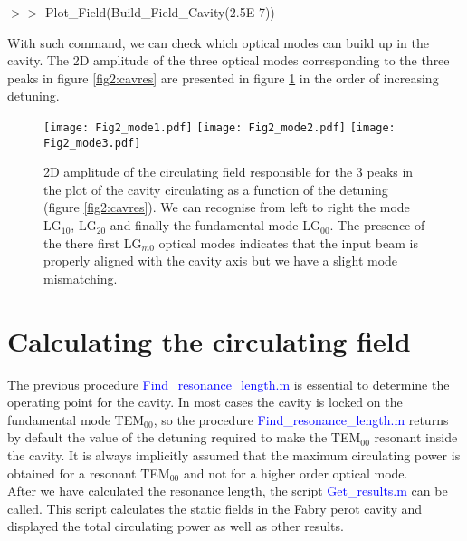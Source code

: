 \vspace*{0.5cm}

$>>$ Plot\_Field(Build\_Field\_Cavity(2.5E-7))

\vspace*{0.5cm}
\noindent With such command, we can check which optical modes can build up in the cavity. The 2D amplitude of the three optical modes corresponding to the three peaks in figure \ref{fig2:cavres} are presented in figure \ref{fig2:HOM} in the order of increasing detuning.


\begin{figure}
\begin{center}
\texttt{[image: Fig2\_mode1.pdf]}\hfill
\texttt{[image: Fig2\_mode2.pdf]}\hfill
\texttt{[image: Fig2\_mode3.pdf]}\hfill
\end{center}
\caption{\label{fig2:HOM} 2D amplitude of the circulating field responsible for the 3 peaks in the plot of the cavity circulating as a function of the detuning (figure \ref{fig2:cavres}). We can recognise from left to right the mode LG$_{10}$, LG$_{20}$ and finally the fundamental mode LG$_{00}$. The presence of the there first LG$_{m0}$ optical modes indicates that the input beam is properly aligned with the cavity axis but we have a slight mode mismatching. }
\end{figure}

\section{Calculating the circulating field}
\label{sec2:4}
The previous procedure \textcolor{blue}{Find\_resonance\_length.m} is essential to determine the operating point for the cavity. In most cases the cavity is locked on the fundamental mode TEM$_{00}$, so the procedure \textcolor{blue}{Find\_resonance\_length.m} returns by default the value of the detuning required to make the TEM$_{00}$ resonant inside the cavity. It is always implicitly assumed that the maximum circulating power is obtained for a resonant TEM$_{00}$ and not for a higher order optical mode.\\

After we have calculated the resonance length, the script \textcolor{blue}{Get\_results.m} can be called. This script calculates the static fields in the Fabry perot cavity and displayed the total circulating power as well as other results.\\

